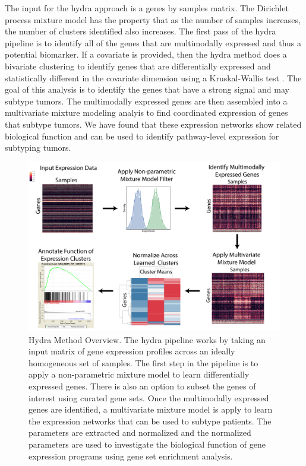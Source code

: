 \documentclass[fleqn,10pt]{wlscirep}
\begin{document}
The input for the hydra approach is a genes by samples matrix. The Dirichlet process mixture model has the property that as the number of samples increases, the number of clusters identified also increases. The first pass of the hydra pipeline is to identify all of the genes that are multimodally expressed and thus a potential biomarker. If a covariate is provided, then the hydra method does a bivariate clustering to identify genes that are differentially expressed and statistically different in the covariate dimension using a Kruskal-Wallis test \cite{mckight2010kruskal}. The goal of this analysis is to identify the genes that have a strong signal and may subtype tumors. The multimodally expressed genes are then assembled into a multivariate mixture modeling analyis to find coordinated expression of genes that subtype tumors. We have found that these expression networks show related biological function and can be used to identify pathway-level expression for subtyping tumors.

\begin{figure}
	\centering
	\includegraphics[width=0.75\linewidth]{images/hydra-overview@2x.png}
	\caption{Hydra Method Overview. The hydra pipeline works by taking an input matrix of gene expression profiles across an ideally homogeneous set of samples. The first step in the pipeline is to apply a non-parametric mixture model to learn differentially expressed genes. There is also an option to subset the genes of interest using curated gene sets. Once the multimodally expressed genes are identified, a multivariate mixture model is apply to learn the expression networks that can be used to subtype patients. The parameters are extracted and normalized and the normalized parameters are used to investigate the biological function of gene expression programs using gene set enrichment analysis.}
	\label{sfig:hydra-overview}
\end{figure}
\end{document}
